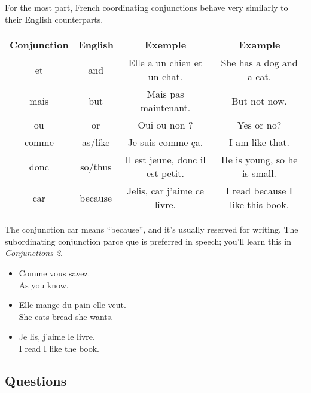 For the most part, French coordinating conjunctions behave very similarly to their English counterparts.

\begin{center}\begin{tabular}{|c|c|c|c|}
\hline
\textbf{Conjunction} & \textbf{English} & \textbf{Exemple} & \textbf{Example}                             \\ \hline
et                   & and              & Elle a un chien et un chat. & She has a dog and a cat.          \\ \hline
mais                 & but              & Mais pas maintenant. & But not now.                             \\ \hline
ou                   & or               & Oui ou non ? & Yes or no?                                       \\ \hline
comme                & as/like          & Je suis comme ça. & I am like that.                             \\ \hline
donc                 & so/thus          & Il est jeune, donc il est petit. & He is young, so he is small. \\ \hline
car                  & because          & Jelis, car j'aime ce livre. & I read because I like this book.  \\ \hline
\end{tabular}\end{center}

The conjunction \guillemotleft car \guillemotright means ``because'', and it's usually reserved for writing. The subordinating conjunction \guillemotleft parce que  \guillemotright is preferred in speech; you'll learn this in \textit{Conjunctions 2}.

\begin{itemize}
  \item  Comme vous savez. \\ As you know.
  \item  Elle mange du pain  elle veut. \\ She eats bread  she wants.
  \item  Je lis,  j'aime le livre. \\ I read  I like the book.
\end{itemize}


\pagebreak
\subsection{Questions}
